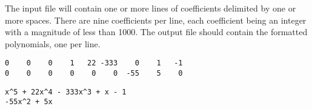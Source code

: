 \bigskip
{}

The input file will contain one or more lines of coefficients
delimited by one or more spaces.  There are nine coefficients per
line, each coefficient being an integer with a magnitude of less than
1000.  The output file should contain the formatted polynomials, one
per line.

\newpage


{\small
\begin{verbatim}
0    0    0    1   22 -333    0    1   -1
0    0    0    0    0    0  -55    5    0
\end{verbatim}
}

\bigskip
{}

{\small
\begin{verbatim}
x^5 + 22x^4 - 333x^3 + x - 1
-55x^2 + 5x
\end{verbatim}
}


